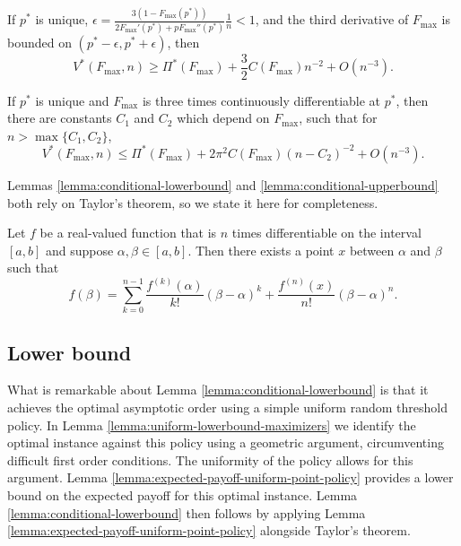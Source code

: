 \documentclass[11pt,a4paper]{article}
\numberwithin{equation}{section}
\begin{document}
\begin{lemma}
    \label{lemma:conditional-lowerbound}
        If $p^*$ is unique, $\epsilon=\frac{3(1-F_{\max}(p^*))}{2F_{\max}'(p^*)+pF_{\max}''(p^*)}\frac{1}{n}<1$, and the third derivative of $F_{\max}$ is bounded on $(p^*-\epsilon, p^*+\epsilon)$, then
        $$
            V^*(F_{\max}, n)\ge \Pi^*(F_{\max})+\frac{3}{2}C(F_{\max})n^{-2}+O(n^{-3}).
        $$
\end{lemma}

\begin{lemma}
    \label{lemma:conditional-upperbound}
        If $p^*$ is unique and $F_{\max}$ is three times continuously differentiable at $p^*$, then there are constants $C_1$ and $C_2$ which depend on $F_{\max}$, such that for $n> \max\{C_1,C_2\}$, 
        $$
            V^*(F_{\max}, n)\le \Pi^*(F_{\max})+2\pi^2C(F_{\max})(n-C_2)^{-2}+O(n^{-3}).
        $$
\end{lemma}




Lemmas \ref{lemma:conditional-lowerbound} and \ref{lemma:conditional-upperbound} both rely on Taylor's theorem, so we state it here for completeness.
\begin{lemma}
    Let $f$
    be a real-valued function that is $n$ times differentiable on the interval $[a,b]$ and suppose $\alpha,\beta\in[a,b]$. Then there exists a point $x$ between $\alpha$ and $\beta$ such that
    $$
    f(\beta)=\sum_{k=0}^{n-1}\frac{f^{(k)}(\alpha)}{k!}(\beta-\alpha)^k+\frac{f^{(n)}(x)}{n!}(\beta-\alpha)^n.
    $$
\end{lemma}
\subsection{Lower bound}
What is remarkable about Lemma \ref{lemma:conditional-lowerbound} is that it achieves the optimal asymptotic order using a simple uniform random threshold policy. In Lemma \ref{lemma:uniform-lowerbound-maximizers} we identify the optimal instance against this policy using a geometric argument, circumventing difficult first order conditions. 
The uniformity of the policy allows for this argument.
Lemma \ref{lemma:expected-payoff-uniform-point-policy} provides a lower bound on the expected payoff for this optimal instance. Lemma \ref{lemma:conditional-lowerbound} then follows by applying Lemma \ref{lemma:expected-payoff-uniform-point-policy} alongside Taylor's theorem.
\end{document}
